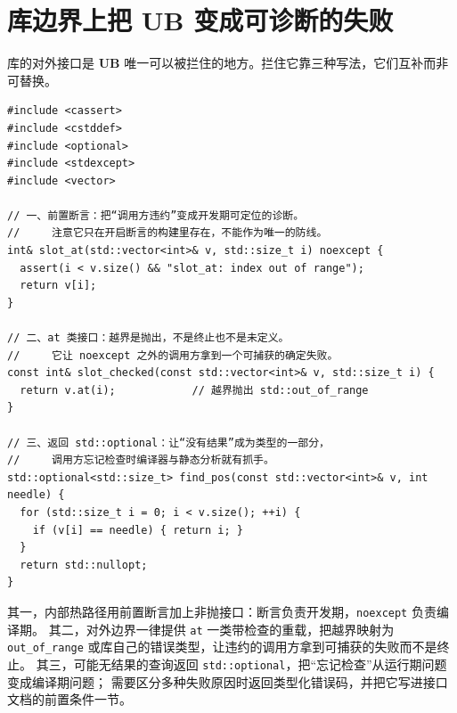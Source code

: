 \documentclass[12pt,a4paper,fontset=fandol]{ctexbook}
\newcommand{\Tp}[1]{\texttt{#1}}
\newcommand{\Bk}{\discretionary{}{}{}}
\newcommand{\UB}{\textbf{\textsf{UB}}}
\begin{document}
\section{库边界上把 \UB{} 变成可诊断的失败}\label{sec:ub11-boundary}

库的对外接口是 \UB{} 唯一可以被拦住的地方。拦住它靠三种写法，它们互补而非可替换。

\begin{lstlisting}[style=cppstyle, caption={库边界的三条拦截写法}]
#include <cassert>
#include <cstddef>
#include <optional>
#include <stdexcept>
#include <vector>

// 一、前置断言：把“调用方违约”变成开发期可定位的诊断。
//     注意它只在开启断言的构建里存在，不能作为唯一的防线。
int& slot_at(std::vector<int>& v, std::size_t i) noexcept {
  assert(i < v.size() && "slot_at: index out of range");
  return v[i];
}

// 二、at 类接口：越界是抛出，不是终止也不是未定义。
//     它让 noexcept 之外的调用方拿到一个可捕获的确定失败。
const int& slot_checked(const std::vector<int>& v, std::size_t i) {
  return v.at(i);            // 越界抛出 std::out_of_range
}

// 三、返回 std::optional：让“没有结果”成为类型的一部分，
//     调用方忘记检查时编译器与静态分析就有抓手。
std::optional<std::size_t> find_pos(const std::vector<int>& v, int needle) {
  for (std::size_t i = 0; i < v.size(); ++i) {
    if (v[i] == needle) { return i; }
  }
  return std::nullopt;
}
\end{lstlisting}

\begin{bestpractice}[title={三条拦截写法的分工}]
其一，内部热路径用前置断言加上非抛接口：断言负责开发期，\Tp{noexcept} 负责编译期。
其二，对外边界一律提供 \Tp{at} 一类带检查的重载，把越界映射为
\Tp{out{\Bk}\_of{\Bk}\_range} 或库自己的错误类型，让违约的调用方拿到可捕获的失败而不是终止。
其三，可能无结果的查询返回 \Tp{std::optional}，把“忘记检查”从运行期问题变成编译期问题；
需要区分多种失败原因时返回类型化错误码，并把它写进接口文档的前置条件一节。
\end{bestpractice}
\end{document}
